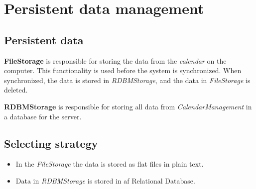 \section{Persistent data management}
\subsection{Persistent data}

\textbf {FileStorage} is responsible for storing the data from the \textit{calendar} on the computer. This functionality is used before the system is synchronized. When synchronized, the data is stored in \textit{RDBMStorage}, and the data in \textit{FileStorage} is deleted. 

\textbf{RDBMStorage} is responsible for storing all data from \textit{CalendarManagement} in a database for the server. 


\subsection*{Selecting strategy}
\begin{itemize}
	\item In the \textit{FileStorage} the data is stored as flat files in plain text. 
	\item Data in \textit{RDBMStorage} is stored in af Relational Database. 
\end{itemize}